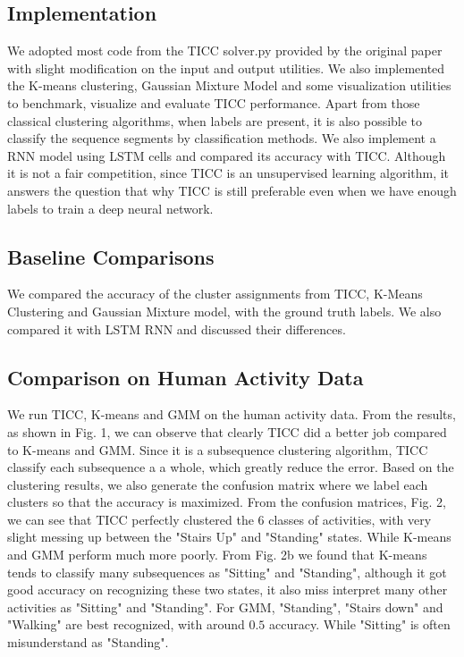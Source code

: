 \documentclass{llncs}
\begin{document}
\subsection{Implementation}
We adopted most code from the TICC solver.py provided by the original paper \cite{tiic} with slight modification on the input and output utilities. We also implemented the K-means clustering, Gaussian Mixture Model and some visualization utilities to benchmark, visualize and evaluate TICC performance. Apart from those classical clustering algorithms, when labels are present, it is also possible to classify the sequence segments by classification methods. We also implement a RNN model using LSTM cells and compared its accuracy with TICC. Although it is not a fair competition, since TICC is an unsupervised learning algorithm, it answers the question that why TICC is still preferable even when we have enough labels to train a deep neural network.

\subsection{Baseline Comparisons}
We compared the accuracy of the cluster assignments from TICC, K-Means Clustering and Gaussian Mixture model, with the ground truth labels. We also compared it with LSTM RNN and discussed their differences.

\subsection{Comparison on Human Activity Data}
We run TICC, K-means and GMM on the human activity data. From the results, as shown in Fig. 1, we can observe that clearly TICC did a better job compared to K-means and GMM. Since it is a subsequence clustering algorithm, TICC classify each subsequence a a whole, which greatly reduce the error. Based on the clustering results, we also generate the confusion matrix where we label each clusters so that the accuracy is maximized. From the confusion matrices, Fig. 2, we can see that TICC perfectly clustered the 6 classes of activities, with very slight messing up between the "Stairs Up" and "Standing" states. While K-means and GMM perform much more poorly. From Fig. 2b we found that K-means tends to classify many subsequences as "Sitting" and "Standing", although it got good accuracy on recognizing these two states, it also miss interpret many other activities as "Sitting" and "Standing". For GMM, "Standing", "Stairs down" and "Walking" are best recognized, with around $0.5$ accuracy. While "Sitting" is often misunderstand as "Standing".
\end{document}
